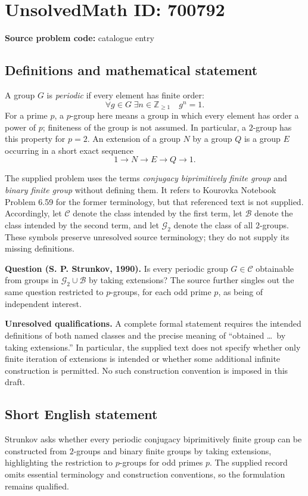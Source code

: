 \documentclass[11pt]{article}
\newcommand{\Z}{\mathbb{Z}}
\begin{document}
\section*{UnsolvedMath ID: 700792}
\textbf{Source problem code:} catalogue entry
\subsection{Definitions and mathematical statement}
A group \(G\) is \emph{periodic} if every element has finite order:
\[
\forall g\in G\;\exists n\in\Z_{\geq 1}\quad g^n=1.
\]
For a prime \(p\), a \(p\)-group here means a group in which every element has order a power of \(p\); finiteness of the group is not assumed. In particular, a \(2\)-group has this property for \(p=2\). An extension of a group \(N\) by a group \(Q\) is a group \(E\) occurring in a short exact sequence
\[
1\longrightarrow N\longrightarrow E\longrightarrow Q\longrightarrow 1.
\]

The supplied problem uses the terms \emph{conjugacy biprimitively finite group} and \emph{binary finite group} without defining them. It refers to Kourovka Notebook Problem 6.59 for the former terminology, but that referenced text is not supplied. Accordingly, let \(\mathcal C\) denote the class intended by the first term, let \(\mathcal B\) denote the class intended by the second term, and let \(\mathcal G_2\) denote the class of all \(2\)-groups. These symbols preserve unresolved source terminology; they do not supply its missing definitions.

\textbf{Question (S. P. Strunkov, 1990).} Is every periodic group \(G\in\mathcal C\) obtainable from groups in \(\mathcal G_2\cup\mathcal B\) by taking extensions? The source further singles out the same question restricted to \(p\)-groups, for each odd prime \(p\), as being of independent interest.

\textbf{Unresolved qualifications.} A complete formal statement requires the intended definitions of both named classes and the precise meaning of ``obtained \dots\ by taking extensions.'' In particular, the supplied text does not specify whether only finite iteration of extensions is intended or whether some additional infinite construction is permitted. No such construction convention is imposed in this draft.
\subsection{Short English statement}
Strunkov asks whether every periodic conjugacy biprimitively finite group can be constructed from \(2\)-groups and binary finite groups by taking extensions, highlighting the restriction to \(p\)-groups for odd primes \(p\). The supplied record omits essential terminology and construction conventions, so the formulation remains qualified.
\end{document}
